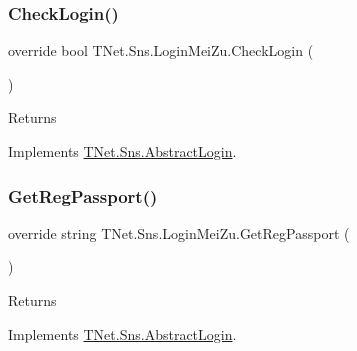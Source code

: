 \subsubsection{\texorpdfstring{Check\+Login()}{CheckLogin()}}
{\footnotesize\ttfamily override bool T\+Net.\+Sns.\+Login\+Mei\+Zu.\+Check\+Login (\begin{DoxyParamCaption}{ }\end{DoxyParamCaption})\hspace{0.3cm}{\ttfamily [virtual]}}





\begin{DoxyReturn}{Returns}

\end{DoxyReturn}


Implements \mbox{\hyperlink{class_t_net_1_1_sns_1_1_abstract_login_a6b5dac3d6d46efb7b1e4049e674105e5}{T\+Net.\+Sns.\+Abstract\+Login}}.

\mbox{\label{class_t_net_1_1_sns_1_1_login_mei_zu_a1a3c3c30ba18024e819f0aa8518eedb8}} 
\subsubsection{\texorpdfstring{Get\+Reg\+Passport()}{GetRegPassport()}}
{\footnotesize\ttfamily override string T\+Net.\+Sns.\+Login\+Mei\+Zu.\+Get\+Reg\+Passport (\begin{DoxyParamCaption}{ }\end{DoxyParamCaption})\hspace{0.3cm}{\ttfamily [virtual]}}





\begin{DoxyReturn}{Returns}

\end{DoxyReturn}


Implements \mbox{\hyperlink{class_t_net_1_1_sns_1_1_abstract_login_a3930eb564bb4804e1b646d749f20907a}{T\+Net.\+Sns.\+Abstract\+Login}}.

\mbox{\label{class_t_net_1_1_sns_1_1_login_mei_zu_ac4d6da6b035c8556bc4e81d1f3ed849b}} 
